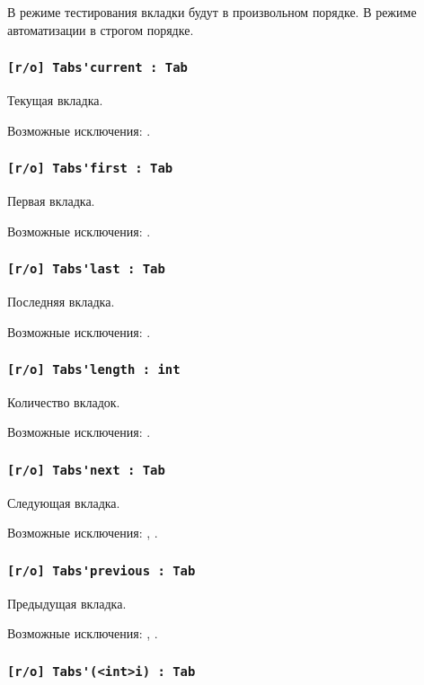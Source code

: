 В режиме тестирования вкладки будут в произвольном порядке. В режиме автоматизации в строгом порядке.

\subsubsection{\lstinline|[r/o] Tabs'current : Tab|}

Текущая вкладка.

Возможные исключения: .

\subsubsection{\lstinline|[r/o] Tabs'first : Tab|}

Первая вкладка.

Возможные исключения: .

\subsubsection{\lstinline|[r/o] Tabs'last : Tab|}

Последняя вкладка.

Возможные исключения: .

\subsubsection{\lstinline|[r/o] Tabs'length : int|}

Количество вкладок.

Возможные исключения: .

\subsubsection{\lstinline|[r/o] Tabs'next : Tab|}

Следующая вкладка.

Возможные исключения: , .

\subsubsection{\lstinline|[r/o] Tabs'previous : Tab|}

Предыдущая вкладка.

Возможные исключения: , .

\subsubsection{\lstinline|[r/o] Tabs'(<int>i) : Tab|}

